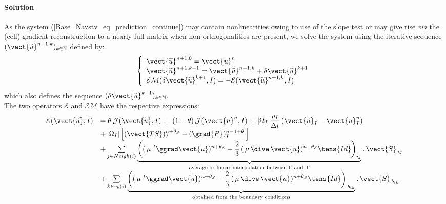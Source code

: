 \paragraph{\bf Solution\\}
As the system (\ref{Base_Navstv_eq_prediction_continue}) may contain nonlinearities
owing to use of the slope test or may give rise {\it via} the (cell) gradient
reconstruction to a nearly-full matrix when non orthogonalities are present,
we solve the system using the iterative sequence
$(\vect{\widetilde{u}}^{n+1,k})_{k\in \mathbb{N}}$ defined by:
\begin{equation}
\left\{\begin{array}{l}
\vect{\widetilde{u}}^{n+1,0} = \vect{u}^{n}\\
\vect{\widetilde{u}}^{n+1,k+1} = \vect{\widetilde{u}}^{n+1,k} + \delta\vect{\widetilde{u}}^{k+1}\\
\mathcal{EM}(\delta\vect{\widetilde{u}}^{k+1},I) = -\mathcal{E}(\vect{\widetilde{u}}^{n+1,k},I) \\
\end{array}\right.
\end{equation}
which also defines the sequence $(\delta\vect{\widetilde{u}}^{k+1})
_{k\in \mathbb{N}}$.\\
The two operators $\mathcal{E}$ and $\mathcal{EM}$ have the respective
expressions:
\begin{equation}\notag
\begin{array}{ll}\label{Base_Navstv_eq_pred_exacte}
\mathcal{E}(\vect{\widetilde{u}},I) &= \theta\, \mathcal{J}(\vect{\widetilde{u}},I)\,+\,(1-\theta)\,\mathcal{J}(\vect{u}^{n},I)\,+ |{\Omega_I}|\displaystyle\frac{\rho_I}{\Delta t}\,(\vect{\widetilde{u}}_{I}-\vect{u}^n_{I}) \\
& +\,|{\Omega_I}|\left[(\vect{TS})^{n+\theta_{S}}_I-(\grad{P})^{n-1+\theta}_I \, \right]\\
&+\sum\limits_{j\in Neigh(i)}{ \underbrace{\left((\,\mu\,\,^{t}\ggrad\vect{u})^{n+\theta_{S}}- \frac{2}{3}\,(\,\mu\, \dive\,\vect{u})^{n+\theta_{S}}\tens{Id}\right)_{ij}}_{\text{average or linear interpolation between I' and J'}}\text{.}\,\vect{S}_{\,ij}}\\
&+\sum\limits_{k\in {\gamma_b(i)}}{ \underbrace{\left((\,\mu\,\,^{t}\ggrad\vect{u})^{n+\theta_{S}}- \frac{2}{3}\,(\,\mu\, \dive\,\vect{u})^{n+\theta_{S}}\tens{Id}\right)_{\,{b}_{ik}}}_\text{obtained from the boundary conditions}\text{.}\,\vect{S}_{\,{b}_{ik}}}\\
&\\
\end{array}
\end{equation}
